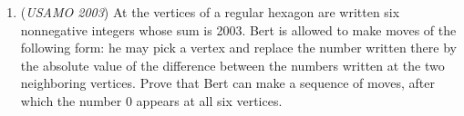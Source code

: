 \begin{enumerate}
 $\dfrac{(2a + b + c)^2}{2a^2 + (b + c)^2} + \dfrac{(2b + c + a)^2}{2b^2 + (c + a)^2} + \dfrac{(2c + a + b)^2}{2c^2 + (a + b)^2} \le 8.$


	\item (\textit{USAMO 2003}) At the vertices of a regular hexagon are written six nonnegative integers whose sum is 2003. Bert is allowed to make moves of the following form: he may pick a vertex and replace the number written there by the absolute value of the difference between the numbers written at the two neighboring vertices. Prove that Bert can make a sequence of moves, after which the number 0 appears at all six vertices.


 

\end{enumerate}